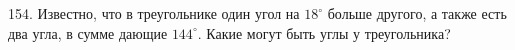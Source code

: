 154. Известно, что в треугольнике один угол на $18^\circ$ больше другого, а также есть два угла, в сумме дающие $144^\circ.$ Какие могут быть углы у треугольника?\\

